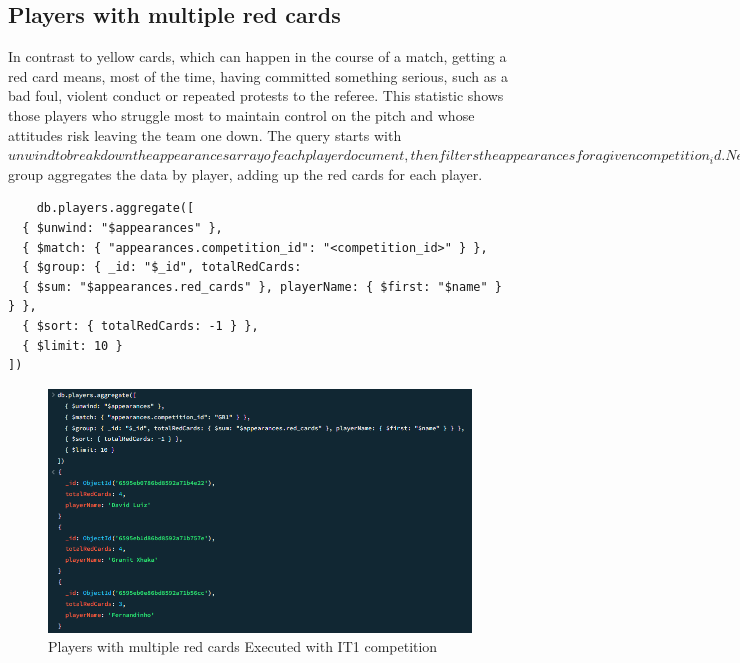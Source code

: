 \documentclass{Configuration_Files/PoliMi3i_thesis}
\begin{document}
\subsection{Players with multiple red cards}
In contrast to yellow cards, which can happen in the course of a match, getting a red card means, most of the time, having committed something serious, such as a bad foul, violent conduct or repeated protests to the referee. This statistic shows those players who struggle most to maintain control on the pitch and whose attitudes risk leaving the team one down. The query starts with $unwind to break down the appearances array of each player document, then filters the appearances for a given competition_id. Next, $group aggregates the data by player, adding up the red cards for each player. 
\begin{verbatim}
    db.players.aggregate([
  { $unwind: "$appearances" },
  { $match: { "appearances.competition_id": "<competition_id>" } },
  { $group: { _id: "$_id", totalRedCards: 
  { $sum: "$appearances.red_cards" }, playerName: { $first: "$name" } } },
  { $sort: { totalRedCards: -1 } },
  { $limit: 10 }
])
\end{verbatim}
\begin{figure}[htbp]
    \centering
    \includegraphics[scale=0.9]{Images/Queries/Competitions_statistics/red-cards/GB1.png}
    \caption{Players with multiple red cards Executed with IT1 competition}
\end{figure}
\end{document}

